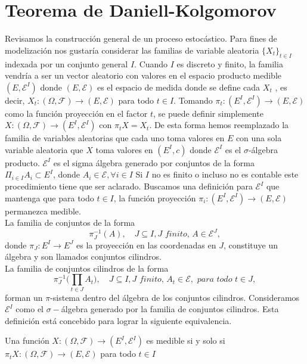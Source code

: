 \section{Teorema de Daniell-Kolgomorov}
    Revisamos la construcción general de un proceso estocástico.
    Para fines de modelización nos gustaría considerar las familias de variable aleatoria $\{X_t\}_{t\in I}$ indexada por un conjunto general $I$. Cuando $I$ es discreto y finito, la familia vendría a ser un vector aleatorio con valores en el espacio producto medible $(E,\mathscr{E}^I)$ donde  $(E, \mathscr{E})$  es el espacio de medida donde se define cada $X_t$ , es decir, $X_t:(\Omega, \mathscr{F}) \rightarrow (E, \mathscr{E})$ para todo $t\in I$.
     Tomando $\pi_t: (E^I,  \mathscr{E}^I) \rightarrow (E,  \mathscr{E})$ como la función proyección en el factor $t$, se puede definir simplemente $X:(\Omega, \mathscr{F})\rightarrow (E^I,  \mathscr{E}^I)$ con $\pi_t X = X_t$.
      De esta forma hemos reemplazado la familia de variables aleatorias  que  cada uno toma valores en $E$ con una sola variable aleatoria que $X$ toma valores en $(E^I, c )$ donde $\mathscr{E}^I$  es el  $\sigma$-álgebra producto.
    $\mathscr{E}^I$ es el sigma álgebra generado por conjuntos de la forma $\Pi_{i\in I}{A_i}\subset E^I$, donde $A_i\in\mathscr{E}, \forall i\in I$
    Si $I$ no es finito o incluso no es contable este procedimiento tiene que ser aclarado.
    Buscamos una definición para $\mathscr{E}^I$ que mantenga que para todo $t\in I$, la función proyección $\pi_i: (E^I,\mathscr{E}^I)\rightarrow (E,\mathscr{E})$ permanezca medible.
    \\La familia de conjuntos de la forma $$\pi^{-1}_J(A), \quad J\subseteq I, \textit{J finito, }A\in\mathscr{E}^J,$$  donde $\pi_J :E^I\rightarrow E^J$	 es la proyección en las coordenadas en $J$, constituye un álgebra y son llamados conjuntos cilindros. 
    \\La familia de conjuntos cilindros de la forma  $$\pi^{-1}_J\bigg(\prod_{t\in J}A_t\bigg), \quad J\subseteq I, \textit{J finito, }A_t\in\mathscr{E}, \textit{ para todo }t\in J,$$
    forman un $\pi$-sistema dentro del álgebra de los conjuntos cilindros.
    Consideramos $\mathscr{E}^I$ como el $\sigma-$álgebra generado por la familia de conjuntos cilindros.
    Esta definición está concebido para lograr la siguiente equivalencia.
    \begin{Lem}
      Una función $X:(\Omega,\mathscr{F})\rightarrow (E^I,\mathscr{E}^I)$ es medible si y solo si $\pi_t X:(\Omega,\mathscr{F})\rightarrow (E,\mathscr{E})$ para todo $t\in I$
    \end{Lem}
